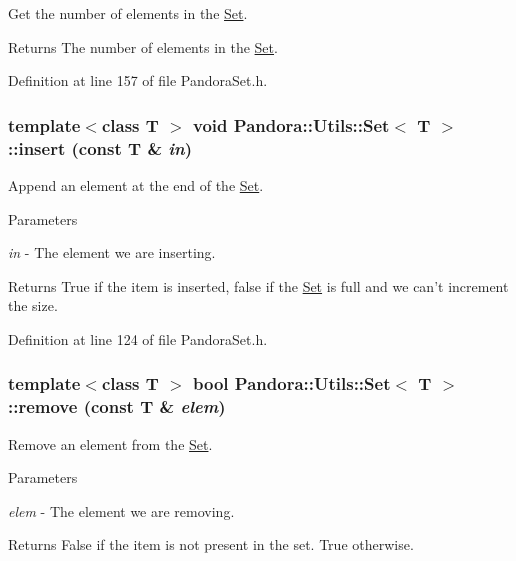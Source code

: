 Get the number of elements in the \hyperlink{classPandora_1_1Utils_1_1Set}{Set}. \begin{DoxyReturn}{Returns}
The number of elements in the \hyperlink{classPandora_1_1Utils_1_1Set}{Set}. 
\end{DoxyReturn}


Definition at line 157 of file PandoraSet.h.\hypertarget{classPandora_1_1Utils_1_1Set_a2c43d731fac0319a5be8c055aae33c8b}{
\subsubsection[{insert}]{\setlength{\rightskip}{0pt plus 5cm}template$<$class T $>$ void {\bf Pandora::Utils::Set}$<$ T $>$::insert (const T \& {\em in})}}
\label{classPandora_1_1Utils_1_1Set_a2c43d731fac0319a5be8c055aae33c8b}


Append an element at the end of the \hyperlink{classPandora_1_1Utils_1_1Set}{Set}. 
\begin{DoxyParams}{Parameters}
\item[{\em in}]-\/ The element we are inserting. \end{DoxyParams}
\begin{DoxyReturn}{Returns}
True if the item is inserted, false if the \hyperlink{classPandora_1_1Utils_1_1Set}{Set} is full and we can't increment the size. 
\end{DoxyReturn}


Definition at line 124 of file PandoraSet.h.\hypertarget{classPandora_1_1Utils_1_1Set_a5094548bb7e9ac74ebc29ae0c4f426a5}{
\subsubsection[{remove}]{\setlength{\rightskip}{0pt plus 5cm}template$<$class T $>$ bool {\bf Pandora::Utils::Set}$<$ T $>$::remove (const T \& {\em elem})}}
\label{classPandora_1_1Utils_1_1Set_a5094548bb7e9ac74ebc29ae0c4f426a5}


Remove an element from the \hyperlink{classPandora_1_1Utils_1_1Set}{Set}. 
\begin{DoxyParams}{Parameters}
\item[{\em elem}]-\/ The element we are removing. \end{DoxyParams}
\begin{DoxyReturn}{Returns}
False if the item is not present in the set. True otherwise. 
\end{DoxyReturn}


